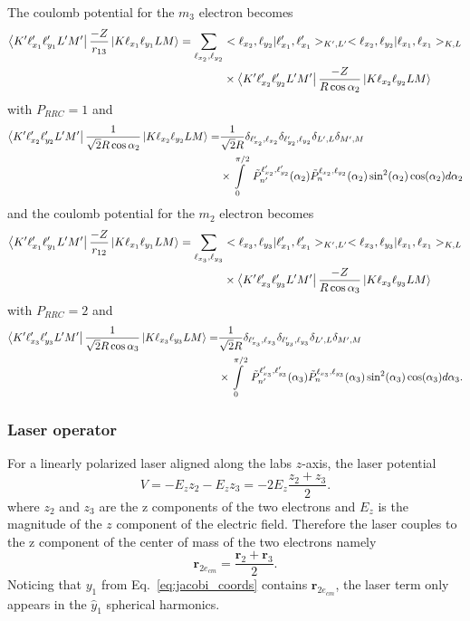 The coulomb potential for the $m_3$ electron becomes
\begin{align}
    \bra{K'\ell_{x_1}'\ell_{y_1}'L'M'} \frac{-Z}{r_{13}} \ket{K \ell_{x_1} \ell_{y_1}LM} = \sum_{\ell_{x_2},\ell_{y_2}}& <\ell_{x_2},\ell_{y_2}|\ell_{x_1}',\ell_{x_1}'>_{K',L'} <\ell_{x_2},\ell_{y_2}|\ell_{x_1},\ell_{x_1}>_{K,L} \\
    &\times \bra{K'\ell_{x_2}'\ell_{y_2}'L'M'} \frac{-Z}{R\cos\alpha_2} \ket{K\ell_{x_2}\ell_{y_2}LM}
\end{align}
with $P_{RRC}=1$  and 
\begin{align}
    \bra{K'\ell_{x_2}'\ell_{y_2}'L'M'} \frac{1}{\sqrt{2}R\cos\alpha_2} \ket{K \ell_{x_2} \ell_{y_2}LM} =& \frac{1}{\sqrt{2}R} \delta_{\ell_{x_2}',\ell_{x_2}} \delta_{\ell_{y_2}',\ell_{y_2}} \delta_{L',L} \delta_{M',M} \\
    & \times \int\limits_0^{\pi/2}\ \tilde{P}^{\ell_{x_2}',\ell_{y_2}'}_{n'}(\alpha_2) \tilde{P}^{\ell_{x_2},\ell_{y_2}}_{n}(\alpha_2) \sin^2(\alpha_2) \cos(\alpha_2)d\alpha_2  
\end{align}
and the coulomb potential for the $m_2$ electron becomes
\begin{align}
    \bra{K'\ell_{x_1}'\ell_{y_1}'L'M'} \frac{-Z}{r_{12}} \ket{K \ell_{x_1} \ell_{y_1}LM} = \sum_{\ell_{x_3},\ell_{y_3}}& <\ell_{x_3},\ell_{y_3}|\ell_{x_1}',\ell_{x_1}'>_{K',L'} <\ell_{x_3},\ell_{y_3}|\ell_{x_1},\ell_{x_1}>_{K,L} \\
    &\times \bra{K'\ell_{x_3}'\ell_{y_3}'L'M'} \frac{-Z}{R\cos\alpha_3} \ket{K\ell_{x_3}\ell_{y_3}LM}
\end{align}
with $P_{RRC}=2$  and 
\begin{align}
    \bra{K'\ell_{x_3}'\ell_{y_3}'L'M'} \frac{1}{\sqrt{2}R\cos\alpha_3} \ket{K \ell_{x_3} \ell_{y_3}LM} =& \frac{1}{\sqrt{2}R} \delta_{\ell_{x_3}',\ell_{x_3}} \delta_{\ell_{y_3}',\ell_{y_3}} \delta_{L',L} \delta_{M',M} \\
    & \times \int\limits_0^{\pi/2}\ \tilde{P}^{\ell_{x_3}',\ell_{y_3}'}_{n'}(\alpha_3) \tilde{P}^{\ell_{x_3},\ell_{y_3}}_{n}(\alpha_3) \sin^2(\alpha_3) \cos(\alpha_3)d\alpha_3.  
\end{align}

\subsubsection{Laser operator}
For a linearly polarized laser aligned along the labs $z$-axis, the laser potential
\begin{equation}
     V = - E_z z_2 - E_z z_3 = - 2E_z \frac{z_2 + z_3}{2}.
\end{equation} 
where $z_2$ and $z_3$ are the z components of the two electrons and $E_z$ is the magnitude of the $z$ component of the electric field.
Therefore the laser couples to the z component of the center of mass of the two electrons namely
\begin{equation}
    \mathbf{r}_{2e_{cm}} = \frac{\mathbf{r}_2 + \mathbf{r}_3}{2}.
\end{equation}
Noticing that $y_1$ from Eq.~\ref{eq:jacobi_coords} contains $\mathbf{r}_{2e_{cm}}$, the laser term only appears in the $\hat{y}_1$ spherical harmonics. 

